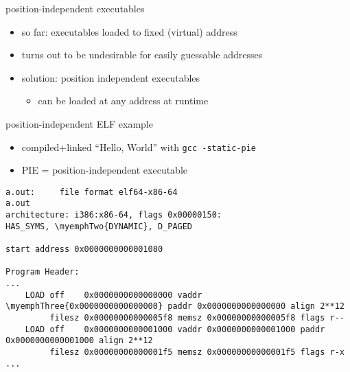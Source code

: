 \providecommand{\myemphTwo}[1]{\myemph<2>{#1}}
\providecommand{\myemphTwoB}[1]{\myemph<2>{\textbf<2>{#1}}}
\providecommand{\myemphThree}[1]{\myemph<3>{#1}}
\providecommand{\myemphFour}[1]{\myemph<4>{#1}}
\providecommand{\myemphFive}[1]{\myemph<5>{#1}}
\providecommand{\myemphSix}[1]{\myemph<6>{#1}}
\providecommand{\myemphSeven}[1]{\myemph<7>{#1}}

\begin{frame}{position-independent executables}
    \begin{itemize}
    \item so far: executables loaded to fixed (virtual) address
    \vspace{.5cm}
    \item turns out to be undesirable for easily guessable addresses
    \item solution: position independent executables
        \begin{itemize}
        \item can be loaded at any address at runtime
        \end{itemize}
    \end{itemize}
\end{frame}

\begin{frame}[fragile,label=elfExOver1]{position-independent ELF example}
    \begin{itemize}
    \item compiled+linked ``Hello, World'' with {\tt gcc -static-pie}
    \item PIE = position-independent executable
    \end{itemize}
\begin{Verbatim}[commandchars=\\\{\},fontsize=\small]
a.out:     file format elf64-x86-64
a.out
architecture: i386:x86-64, flags 0x00000150:
HAS_SYMS, \myemphTwo{DYNAMIC}, D_PAGED

start address 0x0000000000001080

Program Header:
...
    LOAD off    0x0000000000000000 vaddr \myemphThree{0x0000000000000000} paddr 0x0000000000000000 align 2**12
         filesz 0x00000000000005f8 memsz 0x00000000000005f8 flags r--
    LOAD off    0x0000000000001000 vaddr 0x0000000000001000 paddr 0x0000000000001000 align 2**12
         filesz 0x00000000000001f5 memsz 0x00000000000001f5 flags r-x
...
\end{Verbatim}
\end{frame}
